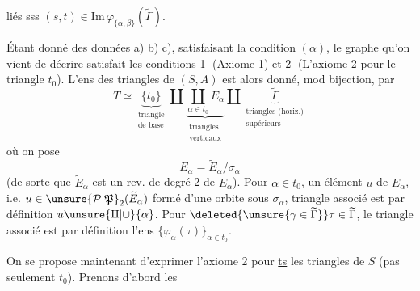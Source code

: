 liés sss $(s,t)\in\mathrm{Im}\,\varphi_{\{\alpha,\beta\}}(\widetilde\Gamma)$.

Étant donné des données a) b) c), satisfaisant la condition $(\alpha)$, le graphe qu'on vient de décrire satisfait les conditions \textcircled{1} (Axiome 1) et \textcircled{2} (L'axiome 2 pour le  triangle $t_0$). L'ens  des triangles de $(S,A)$ est alors donné, mod bijection, par
\[
T\simeq\underbrace{\{t_0\}}_{\substack{\text{triangle}\\\text{de base}}}\amalg
\underbrace{\coprod_{\alpha\in t_0}E_\alpha}_{\substack{\text{triangles}\\\text{verticaux}}}\amalg
\underbrace{\widetilde\Gamma}_{\substack{\text{triangles (horiz.)}\\\text{supérieurs}}}
\]
où on pose 
\[
E_\alpha=\widetilde E_\alpha/\sigma_\alpha
\]
(de sorte que $\widetilde E_\alpha$ est un rev. de degré 2 de $E_\alpha$). Pour $\alpha\in t_0$, un élément $u$ de $E_\alpha$, i.e. $u\in\unsure{\mathcal P|\mathfrak P}_2(\widetilde E_\alpha)$ formé d'une orbite sous $\sigma_\alpha$,  triangle  associé est par définition \deleted{\unsure{$\{$}}$u\unsure{\amalg|\cup}\{\alpha\}$. Pour $\deleted{\unsure{\gamma\in\widetilde\Gamma}}\tau\in\widetilde\Gamma$, le triangle associé est par définition l'ens  $\{\varphi_\alpha(\tau)\}_{\alpha\in t_0}$.

 On se propose maintenant d'exprimer l'axiome 2 pour \uline{ts} les triangles de $S$ (pas seulement $t_0$). Prenons d'abord les
